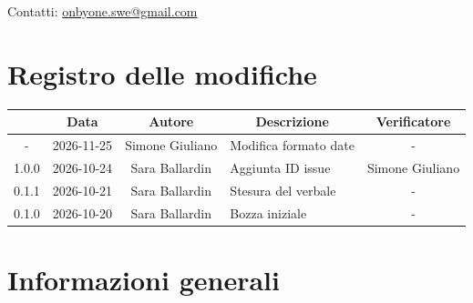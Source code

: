 \documentclass[11pt, a4paper]{article}
\begin{document}
\begin{titlepage}
    \vspace{0.5cm}
    
    {\large Contatti: \href{mailto:onbyone.swe@gmail.com}{onbyone.swe@gmail.com} }
    
\end{titlepage}

\newpage

\section*{Registro delle modifiche}
\vspace{1cm}
\begin{center}
    \renewcommand{\arraystretch}{1.5}
    \begin{tabularx}{\textwidth}{|c|c|c|X|c|}
        \hline
        \rowcolor{gray!10} 
        \multicolumn{1}{|c|}{\textbf{Versione}} & 
        \multicolumn{1}{c|}{\textbf{Data}} & 
        \multicolumn{1}{c|}{\textbf{Autore}} & 
        \multicolumn{1}{c|}{\textbf{Descrizione}} & 
        \multicolumn{1}{c|}{\textbf{Verificatore}} \\
         \hline
        - & 2026-11-25 & Simone Giuliano & Modifica formato date & - \\
        \hline
        1.0.0 & 2026-10-24 & Sara Ballardin & Aggiunta ID issue & Simone Giuliano \\
        \hline
        0.1.1 & 2026-10-21 & Sara Ballardin & Stesura del verbale & - \\
        \hline
        0.1.0 & 2026-10-20 & Sara Ballardin & Bozza iniziale & - \\
        \hline
    \end{tabularx}
\end{center}
\vfill
\newpage

\tableofcontents
\newpage


\section{Informazioni generali}
\end{document}
